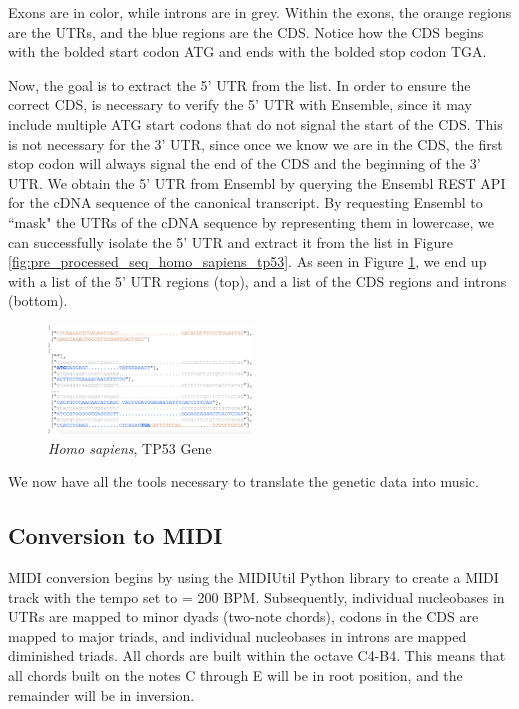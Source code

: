 \documentclass[letterpaper]{article}
\begin{document}
Exons are in color, while introns are in grey. Within the exons, the orange regions are the UTRs, and the blue regions are the CDS. Notice how the CDS begins with the bolded start codon ATG and ends with the bolded stop codon TGA. 

Now, the goal is to extract the 5' UTR from the list. In order to ensure the correct CDS, is necessary to verify the 5' UTR with Ensemble, since it may include multiple ATG start codons that do not signal the start of the CDS. This is not necessary for the 3' UTR, since once we know we are in the CDS, the first stop codon will always signal the end of the CDS and the beginning of the 3' UTR. We obtain the 5' UTR from Ensembl by querying the Ensembl REST API for the cDNA sequence of the canonical transcript. By requesting Ensembl to ``mask" the UTRs of the cDNA sequence by representing them in lowercase, we can successfully isolate the 5' UTR and extract it from the list in Figure \ref{fig:pre_processed_seq_homo_sapiens_tp53}. As seen in Figure \ref{fig:post_processed_seq_homo_sapiens_tp53}, we end up with a list of the 5' UTR regions (top), and a list of the CDS regions and introns (bottom).\cite{10.1162/artl_a_00325}

\begin{figure}[h!]
\centering
\includegraphics[width=0.48\textwidth]{images/post_processed_seq_homo_sapiens_tp53_ABBREV}
\vspace{-3mm}
  \caption{\textit{Homo sapiens}, TP53 Gene}\label{fig:post_processed_seq_homo_sapiens_tp53}
  \vspace{-3mm}
\end{figure}

We now have all the tools necessary to translate the genetic data into music.

\subsection{Conversion to MIDI}

MIDI conversion begins by using the MIDIUtil Python library to create a MIDI track with the tempo set to \musQuarter\;= 200 BPM. Subsequently, individual nucleobases in UTRs are mapped to minor dyads (two-note chords), codons in the CDS are mapped to major triads, and individual nucleobases in introns are mapped diminished triads. All chords are built within the octave C4-B4. This means that all chords built on the notes C through E will be in root position, and the remainder will be in inversion.
\end{document}
